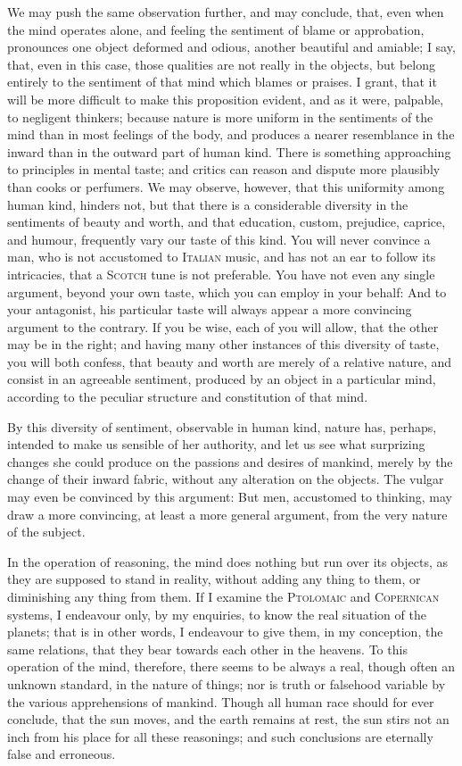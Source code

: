 We may push the same observation further, and may conclude, that, even
when the mind operates alone, and feeling the sentiment of blame or
approbation, pronounces one object deformed and odious, another
beautiful and amiable; I say, that, even in this case, those qualities
are not really in the  objects, but belong entirely to the
sentiment of that mind which blames or praises. I grant, that it will
be more difficult to make this proposition evident, and as it were,
palpable, to negligent thinkers; because nature is more uniform in the
sentiments of the mind than in most feelings of the body, and produces
a nearer resemblance in the inward than in the outward part of human
kind. There is something approaching to principles in mental taste;
and critics can reason and dispute more plausibly than cooks or
perfumers. We may observe, however, that this uniformity among human
kind, hinders not, but that there is a considerable diversity in the
sentiments of beauty and worth, and that education, custom, prejudice,
caprice, and humour, frequently vary our taste of this kind. You will
never convince a man, who is not accustomed to \textsc{Italian} music,
and has not an ear to follow its intricacies, that a \textsc{Scotch}
tune is not preferable. You have not even any single argument, beyond
your own taste, which you can employ in your behalf: And to your
antagonist, his particular taste will always appear a more convincing
argument to the contrary. If you be wise, each of you will allow, that
the other may be in the right; and having many other instances of this
diversity of taste, you will both confess, that beauty and worth are
merely of a relative nature, and consist in an agreeable sentiment,
produced by an object in a particular mind, according to the peculiar
structure and constitution of that mind.

By this diversity of sentiment, observable in human kind, nature has,
perhaps, intended to make us sensible of her authority, and let us see
what surprizing changes she could produce on the passions and desires
of mankind, merely by the change of their inward fabric, without any
alteration on the objects. The vulgar may even be convinced by this
argument: But men, accustomed to thinking, may draw a more convincing,
at least a more general argument, from the very nature of the subject.

In the operation of reasoning, the mind does nothing but run over its
objects, as they are supposed to stand in reality, without adding any
thing to them, or diminishing any thing from them. If I examine the
\textsc{Ptolomaic} and \textsc{Copernican} systems, I endeavour only,
by my enquiries, to know the real situation of the planets; that is in
other words, I endeavour to give them, in my conception, the same
relations, that they  bear towards each other in the
heavens. To this operation of the mind, therefore, there seems to be
always a real, though often an unknown standard, in the nature of
things; nor is truth or falsehood variable by the various
apprehensions of mankind. Though all human race should for ever
conclude, that the sun moves, and the earth remains at rest, the sun
stirs not an inch from his place for all these reasonings; and such
conclusions are eternally false and erroneous.

